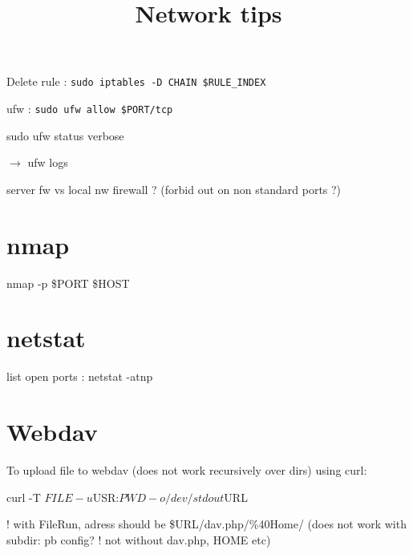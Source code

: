 


\title{Network tips}



\date{}


\maketitle

\justify

\renewcommand{\abstractname}{}

\begin{abstract}

\end{abstract}




Delete rule : \texttt{sudo iptables -D CHAIN \$RULE_INDEX}

ufw : \texttt{sudo ufw allow \$PORT/tcp}

sudo ufw status verbose

$\rightarrow$ ufw logs

server fw vs local nw firewall ? (forbid out on non standard ports ?)


\section*{nmap}

nmap -p \$PORT \$HOST 


\section*{netstat}

list open ports : netstat -atnp



\section*{Webdav}

To upload file to webdav (does not work recursively over dirs) using curl:

curl -T $FILE -u $USR:$PWD -o /dev/stdout $URL

! with FileRun, adress should be \$URL/dav.php/\%40Home/
(does not work with subdir: pb config? ! not without dav.php, HOME etc)


